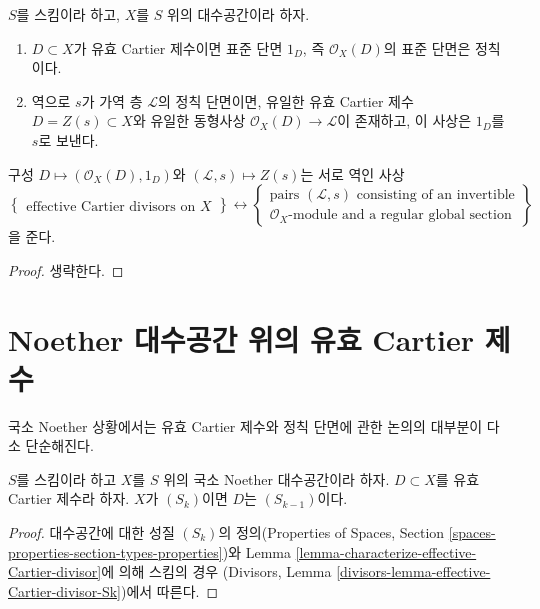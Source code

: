 \begin{lemma}
\label{lemma-characterize-OD}
$S$를 스킴이라 하고, $X$를 $S$ 위의 대수공간이라 하자.
\begin{enumerate}
\item $D \subset X$가 유효 Cartier 제수이면 표준 단면 $1_D$, 즉
$\mathcal{O}_X(D)$의 표준 단면은 정칙이다.
\item 역으로 $s$가 가역 층 $\mathcal{L}$의 정칙 단면이면, 유일한 유효
Cartier 제수 $D = Z(s) \subset X$와 유일한 동형사상
$\mathcal{O}_X(D) \to \mathcal{L}$이 존재하고, 이 사상은 $1_D$를 $s$로
보낸다.
\end{enumerate}
구성
$D \mapsto (\mathcal{O}_X(D), 1_D)$와 $(\mathcal{L}, s) \mapsto Z(s)$는
서로 역인 사상
$$
\left\{
\begin{matrix}
\text{effective Cartier divisors on }X
\end{matrix}
\right\}
\leftrightarrow
\left\{
\begin{matrix}
\text{pairs }(\mathcal{L}, s)\text{ consisting of an invertible}\\
\mathcal{O}_X\text{-module and a regular global section}
\end{matrix}
\right\}
$$
을 준다.
\end{lemma}

\begin{proof}
생략한다.
\end{proof}





\section{Noether 대수공간 위의 유효 Cartier 제수}
\label{section-Noetherian-effective-Cartier}

\noindent
국소 Noether 상황에서는 유효 Cartier 제수와 정칙 단면에 관한 논의의
대부분이 다소 단순해진다.

\begin{lemma}
\label{lemma-effective-Cartier-divisor-Sk}
$S$를 스킴이라 하고 $X$를 $S$ 위의 국소 Noether 대수공간이라 하자.
$D \subset X$를 유효 Cartier 제수라 하자. $X$가 $(S_k)$이면 $D$는
$(S_{k - 1})$이다.
\end{lemma}

\begin{proof}
대수공간에 대한 성질 $(S_k)$의 정의(Properties of Spaces, Section
\ref{spaces-properties-section-types-properties})와 Lemma
\ref{lemma-characterize-effective-Cartier-divisor}에 의해 스킴의 경우
(Divisors, Lemma \ref{divisors-lemma-effective-Cartier-divisor-Sk})에서
따른다.
\end{proof}

